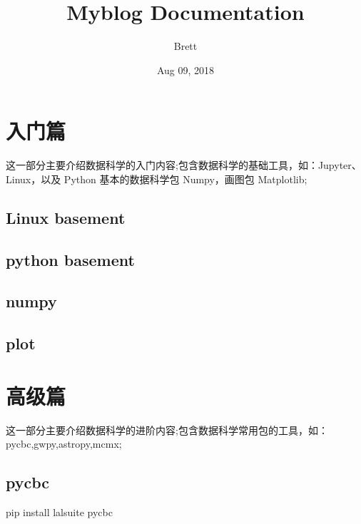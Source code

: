 \documentclass[letterpaper,10pt,english]{sphinxmanual}
\title{Myblog Documentation}
\date{Aug 09, 2018}
\author{Brett}
\begin{document}
\maketitle
\sphinxtableofcontents
{}\label{\detokenize{index::doc}}



\chapter{入门篇}
\label{\detokenize{base/index:welcome-to-myblog-s-documentation}}\label{\detokenize{base/index::doc}}\label{\detokenize{base/index:id1}}
这一部分主要介绍数据科学的入门内容;包含数据科学的基础工具，如：Jupyter、Linux，以及 Python 基本的数据科学包 Numpy，画图包 Matplotlib;


\section{Linux basement}
\label{\detokenize{base/01_linux::doc}}\label{\detokenize{base/01_linux:linux-basement}}

\section{python basement}
\label{\detokenize{base/02_ipython:python-basement}}\label{\detokenize{base/02_ipython::doc}}

\section{numpy}
\label{\detokenize{base/03_numpy:numpy}}\label{\detokenize{base/03_numpy::doc}}

\section{plot}
\label{\detokenize{base/04_matplotlib:plot}}\label{\detokenize{base/04_matplotlib::doc}}

\chapter{高级篇}
\label{\detokenize{advanced/index::doc}}\label{\detokenize{advanced/index:id1}}
这一部分主要介绍数据科学的进阶内容;包含数据科学常用包的工具，如：
pycbc,gwpy,astropy,mcmx;


\section{pycbc}
\label{\detokenize{advanced/01_pycbc:pycbc}}\label{\detokenize{advanced/01_pycbc::doc}}
pip install lalsuite pycbc
\end{document}

